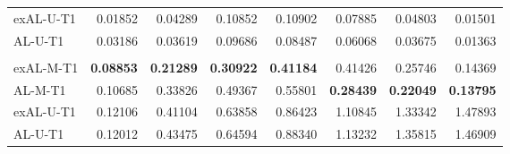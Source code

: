 \begin{center}
\begin{tabular}{>{\ttfamily}l rrrrrrr}
exAL-U-T1 & 0.01852 & 0.04289 & 0.10852 & 0.10902 & 0.07885 & 0.04803 & 0.01501 \\
AL-U-T1 & 0.03186 & 0.03619 & 0.09686 & 0.08487 & 0.06068 & 0.03675 & 0.01363 \\
\addlinespace[1pt]
\multicolumn{8}{l}{\textit{Cutoff 12/25/2022}} \\
exAL-M-T1 & \textbf{0.08853} & \textbf{0.21289} & \textbf{0.30922} & \textbf{0.41184} & 0.41426 & 0.25746 & 0.14369 \\
AL-M-T1 & 0.10685 & 0.33826 & 0.49367 & 0.55801 & \textbf{0.28439} & \textbf{0.22049} & \textbf{0.13795} \\
exAL-U-T1 & 0.12106 & 0.41104 & 0.63858 & 0.86423 & 1.10845 & 1.33342 & 1.47893 \\
AL-U-T1 & 0.12012 & 0.43475 & 0.64594 & 0.88340 & 1.13232 & 1.35815 & 1.46909 \\
\bottomrule
\end{tabular}
\end{center}
